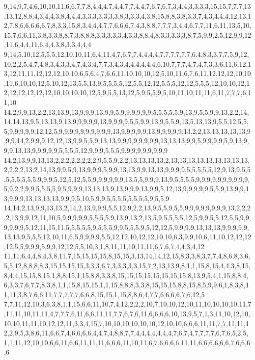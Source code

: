 9,14,9,7,4,6,10,10,11,6,6,7,7,8,4,4,4,7,4,4,7,7,4,4,7,6,7,6,7,3,4,4,3,3,3,3,15,15,7,7,7,13,13,12,8,8,4,3,4,4,3,8,4,4,4,3,3,3,3,3,3,3,8,3,3,3,4,3,8,15,8,8,3,8,3,3,7,4,3,4,4,4,12,13,12,7,8,6,6,6,6,6,7,8,3,3,15,8,3,4,4,4,7,7,6,6,6,7,4,3,8,8,7,7,7,3,4,4,6,7,7,11,6,11,13,5,10,15,7,6,6,11,3,8,3,3,8,8,7,3,8,8,8,3,3,3,3,3,4,3,3,8,8,4,8,3,3,3,3,3,8,7,5,9,9,2,5,12,9,9,12,11,6,4,4,11,6,4,4,3,8,3,3,4,4,4
9,14,5,10,12,5,5,5,12,10,10,11,6,4,11,4,7,6,7,7,4,4,4,4,7,7,7,7,7,7,6,4,8,3,3,7,7,5,9,12,10,2,2,5,4,7,4,8,3,4,3,3,4,7,4,3,4,7,7,3,4,3,4,4,4,4,4,4,6,10,7,7,7,4,7,4,7,3,3,6,11,6,12,13,12,11,11,12,12,12,10,10,6,5,6,4,7,6,6,11,10,10,10,12,5,10,11,6,7,6,11,12,12,12,10,10,11,6,10,10,12,5,10,12,13,5,5,13,9,5,5,5,5,12,5,5,12,12,5,5,5,12,12,5,5,5,12,10,10,12,12,12,12,12,12,12,10,10,10,10,12,5,9,5,5,13,12,5,9,5,5,9,5,10,11,10,11,11,6,11,7,7,7,6,11,10
14,2,9,9,13,2,2,13,13,9,13,9,9,9,13,9,9,5,9,9,9,9,9,9,5,5,5,5,5,9,13,9,5,5,9,9,13,2,2,14,14,14,13,9,5,13,13,9,13,9,9,9,9,9,13,9,9,9,9,5,5,9,9,13,9,5,5,9,13,5,13,13,9,5,5,12,5,5,5,9,9,9,9,9,12,12,5,9,9,9,9,9,9,9,9,9,9,13,9,9,9,9,9,13,9,9,9,9,9,13,2,2,13,13,13,13,13,9,9,9,14,2,9,9,9,12,12,13,9,9,5,5,9,13,13,9,9,9,9,9,9,9,9,13,13,13,9,9,5,9,9,9,9,5,9,13,9,9,9,13,13,9,9,9,9,9,5,5,5,5,12,9,9,9,5,5,5,9,9,9,9,9,9,9,9,9
14,2,13,9,9,13,13,2,2,2,2,2,2,2,2,9,5,5,9,2,2,13,13,13,13,2,13,13,13,13,13,13,13,13,13,2,2,2,2,13,2,14,13,9,9,5,9,13,9,9,9,5,9,9,13,13,9,9,13,13,9,9,9,9,5,5,5,5,5,12,9,13,9,5,5,5,5,5,5,5,5,9,9,9,5,12,5,12,5,5,9,9,9,9,9,9,13,5,5,9,9,9,13,9,5,5,5,5,9,9,9,9,9,9,9,9,9,9,5,9,2,2,9,9,5,5,5,5,9,5,9,9,9,13,13,13,9,13,9,9,9,13,9,9,5,12,13,9,9,9,9,9,5,5,9,13,9,9,13,9,9,9,13,13,13,13,9,9,9,5,10,5,9,9,5,5,5,5,5,5,5,5,9,5,5,9
14,14,2,13,9,9,13,13,2,14,2,13,9,9,9,5,5,12,9,2,2,13,9,5,5,9,5,5,9,9,9,9,9,9,9,9,13,2,2,2,2,13,9,9,12,11,10,5,9,9,9,9,9,5,5,5,5,9,13,9,13,2,13,5,9,5,5,5,5,12,5,9,9,5,5,12,5,5,9,9,9,9,9,9,5,12,11,15,11,5,5,5,5,5,9,5,5,5,9,9,5,5,5,9,5,12,12,5,9,9,9,9,13,13,13,9,9,9,9,9,13,13,9,5,5,5,12,10,11,6,5,9,9,9,9,5,5,12,12,10,12,12,10,10,6,3,9,9,10,6,11,10,12,12,12,12,5,5,9,9,9,5,9,9,12,12,5,5,10,3,1,8,11,11,10,11,11,6,7,6,7,4,4,3,4,12
11,11,6,4,4,8,4,3,8,11,7,15,15,15,15,8,15,15,3,13,14,14,12,15,8,3,3,8,3,7,7,4,8,6,8,3,6,5,5,12,8,8,8,8,3,15,15,15,15,3,3,3,6,7,3,3,3,3,3,15,7,2,13,13,9,8,1,1,15,8,15,4,4,3,8,15,8,4,4,15,15,8,15,1,8,8,15,1,15,8,8,3,3,8,15,15,15,15,15,15,15,15,8,13,9,5,4,1,15,8,8,4,6,3,3,7,6,7,7,8,3,8,1,1,15,8,15,15,1,1,15,8,8,8,3,3,8,15,15,15,8,8,15,8,5,9,9,6,1,8,3,8,11,11,3,8,7,6,6,11,7,7,7,7,7,6,6,8,15,15,1,15,8,8,6,4,7,7,6,6,6,6,7,6,12,5
7,7,11,12,10,3,6,3,8,1,1,15,6,6,11,10,7,4,12,2,2,2,10,7,10,10,12,10,11,10,10,10,10,11,7,11,11,10,11,11,4,7,7,7,6,11,6,6,11,11,7,7,6,7,6,11,6,6,6,6,10,13,9,5,7,1,3,11,10,12,10,10,10,11,11,10,12,12,11,3,3,4,15,7,10,10,10,10,10,10,12,10,10,6,6,6,11,11,7,7,11,11,12,2,9,5,3,8,6,11,6,6,7,4,6,6,6,6,4,4,7,4,8,8,7,7,4,4,4,4,4,4,4,7,6,7,4,7,7,7,7,6,7,6,5,2,5,1,1,11,12,10,10,6,6,11,6,6,11,11,11,6,6,6,11,10,11,6,7,6,6,6,6,11,11,6,6,6,6,6,6,7,6,6,6,6
